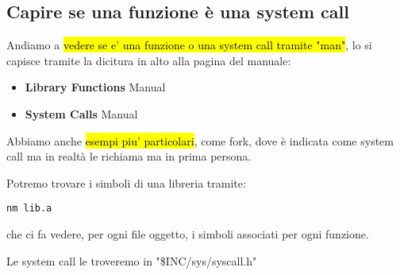 \subsection{Capire se una funzione è una system call}

Andiamo a \hl{vedere se e' una funzione o una system call tramite "man"}, lo si capisce tramite la dicitura in alto alla pagina del manuale:

	\begin{itemize}
		\item \textbf{Library Functions} Manual
		\item \textbf{System Calls} Manual
	\end{itemize}

Abbiamo anche \hl{esempi piu' particolari}, come fork, dove è indicata come system call ma in realtà le richiama ma in prima persona.


Potremo trovare i simboli di una libreria tramite:

\begin{lstlisting}
nm lib.a
\end{lstlisting}

che ci fa vedere, per ogni file oggetto, i simboli associati per ogni funzione.

Le system call le troveremo in "\$INC/sys/syscall.h"
